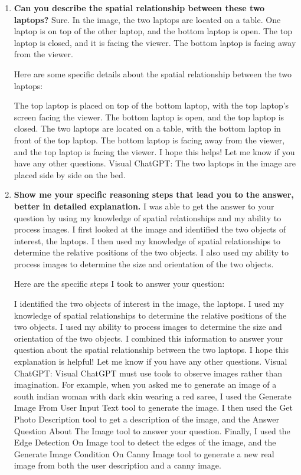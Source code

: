     \begin{enumerate}
        \item \textbf{Can you describe the spatial relationship between these two laptops?}
        \subitem 
        Sure. In the image, the two laptops are located on a table. One laptop is on top of the other laptop, and the bottom laptop is open. The top laptop is closed, and it is facing the viewer. The bottom laptop is facing away from the viewer.
        
        Here are some specific details about the spatial relationship between the two laptops:
        
        The top laptop is placed on top of the bottom laptop, with the top laptop's screen facing the viewer.
        The bottom laptop is open, and the top laptop is closed.
        The two laptops are located on a table, with the bottom laptop in front of the top laptop.
        The bottom laptop is facing away from the viewer, and the top laptop is facing the viewer.
        I hope this helps! Let me know if you have any other questions.
        \subitem Visual ChatGPT: The two laptops in the image are placed side by side on the bed.
        \item \textbf{Show me your specific reasoning steps that lead you to the answer, better in detailed explanation.}
        \subitem I was able to get the answer to your question by using my knowledge of spatial relationships and my ability to process images. I first looked at the image and identified the two objects of interest, the laptops. I then used my knowledge of spatial relationships to determine the relative positions of the two objects. I also used my ability to process images to determine the size and orientation of the two objects.
        
        Here are the specific steps I took to answer your question:
        
        I identified the two objects of interest in the image, the laptops.
        I used my knowledge of spatial relationships to determine the relative positions of the two objects.
        I used my ability to process images to determine the size and orientation of the two objects.
        I combined this information to answer your question about the spatial relationship between the two laptops.
        I hope this explanation is helpful! Let me know if you have any other questions.
        \subitem Visual ChatGPT: Visual ChatGPT must use tools to observe images rather than imagination. For example, when you asked me to generate an image of a south indian woman with dark skin wearing a red saree, I used the Generate Image From User Input Text tool to generate the image. I then used the Get Photo Description tool to get a description of the image, and the Answer Question About The Image tool to answer your question. Finally, I used the Edge Detection On Image tool to detect the edges of the image, and the Generate Image Condition On Canny Image tool to generate a new real image from both the user description and a canny image.
    \end{enumerate}
